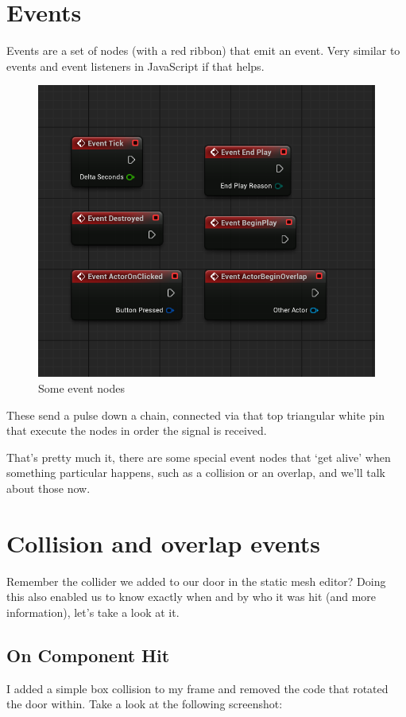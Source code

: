 \documentclass[]{article}
\begin{document}
	\section{Events}
	Events are a set of nodes (with a red ribbon) that emit an event. Very similar to events and event listeners in JavaScript if that helps.
	\begin{figure}[h!]
		\centering
		\includegraphics[width=0.6\linewidth]{week2part2/screenshot005}
		\caption[]{Some event nodes}
		\label{fig:screenshot005}
	\end{figure}
	
	\newpage
	
	These send a pulse down a chain, connected via that top triangular white pin that execute the nodes in order the signal is received.
	
	That's pretty much it, there are some special event nodes that `get alive' when something particular happens, such as a collision or an overlap, and we'll talk about those now.
	
	\section{Collision and overlap events}
	 
	Remember the collider we added to our door in the static mesh editor? Doing this also enabled us to know exactly when and by who it was hit (and more information), let's take a look at it.
	
	\subsection{On Component Hit}
	I added a simple box collision to my frame and removed the code that rotated the door within. Take a look at the following screenshot:
	
\end{document}
